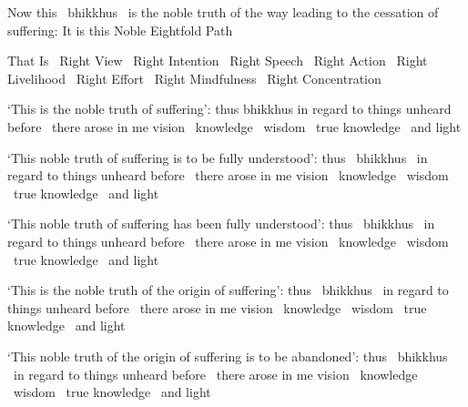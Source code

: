 \begin{english-only-hang}
  Now this \breathmark\ bhikkhus \breathmark\ is the noble truth of the way leading to the cessation of suffering: It is this Noble Eightfold Path
\end{english-only-hang}

\begin{english-only-hang}
  That Is \breathmark\ Right View \breathmark\ Right Intention \breathmark\ Right Speech \breathmark\ Right Action \breathmark\ Right Livelihood \breathmark\ Right Effort \breathmark\ Right Mindfulness \breathmark\ Right Concentration
\end{english-only-hang}

\begin{english-only-hang}
  `This is the noble truth of suffering': thus bhikkhus in regard to things unheard before \breathmark\ there arose in me vision \breathmark\ knowledge \breathmark\ wisdom \breathmark\ true knowledge \breathmark\ and light
\end{english-only-hang}

\begin{english-only-hang}
  `This noble truth of suffering is to be fully understood': thus \breathmark\ bhikkhus \breathmark\ in regard to things unheard before \breathmark\ there arose in me vision \breathmark\ knowledge \breathmark\ wisdom \breathmark\ true knowledge \breathmark\ and light
\end{english-only-hang}

\begin{english-only-hang}
  `This noble truth of suffering has been fully understood': thus \breathmark\ bhikkhus \breathmark\ in regard to things unheard before \breathmark\ there arose in me vision \breathmark\ knowledge \breathmark\ wisdom \breathmark\ true knowledge \breathmark\ and light
\end{english-only-hang}

\begin{english-only-hang}
  `This is the noble truth of the origin of suffering': thus \breathmark\ bhikkhus \breathmark\ in regard to things unheard before \breathmark\ there arose in me vision \breathmark\ knowledge \breathmark\ wisdom \breathmark\ true knowledge \breathmark\ and light
\end{english-only-hang}

\begin{english-only-hang}
  `This noble truth of the origin of suffering is to be abandoned': thus \breathmark\ bhikkhus \breathmark\ in regard to things unheard before \breathmark\ there arose in me vision \breathmark\ knowledge \breathmark\ wisdom \breathmark\ true knowledge \breathmark\ and light
\end{english-only-hang}

